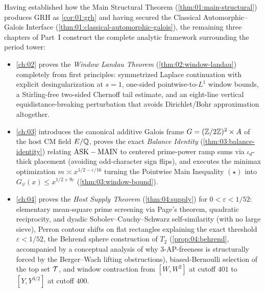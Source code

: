 Having established how the Main Structural Theorem (\cref{thm:01:main-structural}) produces GRH as \cref{cor:01:grh} and having secured the Classical Automorphic--Galois Interface (\cref{thm:01:classical-automorphic-galois}), the remaining three chapters of Part~I construct the complete analytic framework surrounding the period tower:
\begin{itemize}
\item \cref{ch:02} proves the \emph{Window Landau Theorem} (\cref{thm:02:window-landau}) completely from first principles: symmetrized Laplace continuation with explicit desingularization at $s=1$, one-sided pointwise-to-$L^1$ window bounds, a Stirling-free two-sided Chernoff tail estimate, and an eight-line vertical equidistance-breaking perturbation that avoids Dirichlet/Bohr approximation altogether.
\item \cref{ch:03} introduces the canonical additive Galois frame $G = (\mathbb{Z}/2\mathbb{Z})^2 \times A$ of the host CM field $E/\mathbb{Q}$, proves the exact \emph{Balance Identity} (\cref{thm:03:balance-identity}) relating $\mathrm{ASK} - \mathrm{MAIN}$ to centered prime-power ramp sums via $\iota_d$-thick placement (avoiding odd-character sign flips), and executes the minimax optimization $m \asymp x^{1/2-\varepsilon/16}$ turning the Pointwise Main Inequality $(\star)$ into $G_\psi(x) \le x^{1/2+9\varepsilon}$ (\cref{thm:03:window-bound}).
\item \cref{ch:04} proves the \emph{Host Supply Theorem} (\cref{thm:04:supply}) for $0 < \varepsilon < 1/52$: elementary mean-square prime screening via Page's theorem, quadratic reciprocity, and dyadic Sobolev--Cauchy--Schwarz self-similarity (with no large sieve), Perron contour shifts on flat rectangles explaining the exact threshold $\varepsilon < 1/52$, the Behrend sphere construction of $T_2$ (\cref{prop:04:behrend}, accompanied by a conceptual analysis of why $3$-AP-freeness is structurally forced by the Berger--Wach lifting obstructions), biased-Bernoulli selection of the top set $\mathcal{T}$, and window contraction from $[W, W^2]$ at cutoff $401$ to $[Y, Y^{3/2}]$ at cutoff $400$.
\end{itemize}
